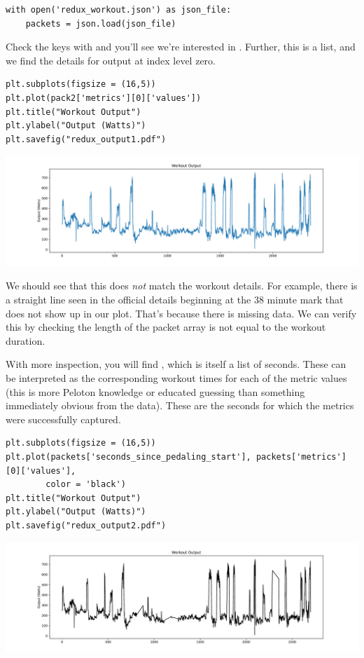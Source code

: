 \begin{lstlisting}
with open('redux_workout.json') as json_file:
    packets = json.load(json_file)
\end{lstlisting}

Check the keys with  and you'll see we're interested in . Further, this is a list, and we find the details for output at index level zero. 

\begin{lstlisting}
plt.subplots(figsize = (16,5))
plt.plot(pack2['metrics'][0]['values'])
plt.title("Workout Output")
plt.ylabel("Output (Watts)")
plt.savefig("redux_output1.pdf")
\end{lstlisting}

\begin{center}
    \includegraphics[width = .9\textwidth]{images/redux_output1.pdf}
\end{center}

We should see that this does \emph{not} match the workout details. For example, there is a straight line seen in the official details beginning at the 38 minute mark that does not show up in our plot. That's because there is missing data. We can verify this by checking the length of the packet array is not equal to the workout duration. 

With more inspection, you will find , which is itself a list of seconds. These can be interpreted as the corresponding workout times for each of the metric values (this is more Peloton knowledge or educated guessing than something immediately obvious from the data). These are the seconds for which the metrics were successfully captured. 
\begin{lstlisting}
plt.subplots(figsize = (16,5))
plt.plot(packets['seconds_since_pedaling_start'], packets['metrics'][0]['values'],
        color = 'black')
plt.title("Workout Output")
plt.ylabel("Output (Watts)")
plt.savefig("redux_output2.pdf")
\end{lstlisting}

\begin{center}
    \includegraphics[width = .9\textwidth]{images/redux_output2.pdf}
\end{center}

